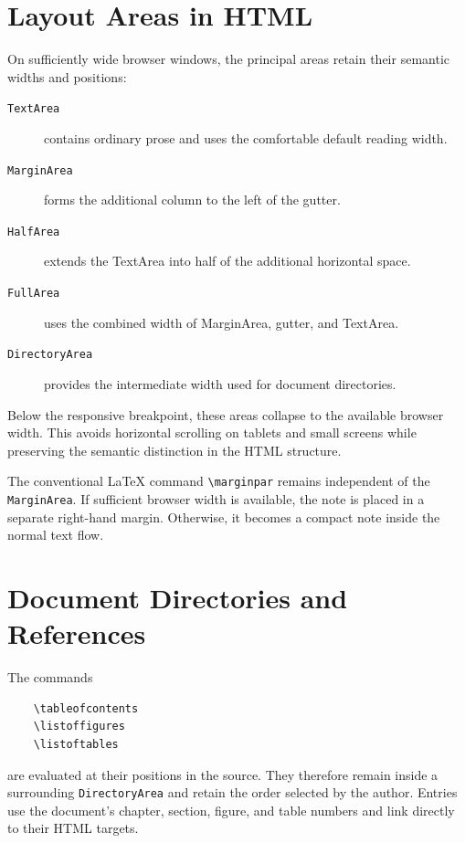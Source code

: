 \documentclass[
11pt,
a4paper,
oneside
]{scrbook}
\begin{document}
{\section{Layout Areas in HTML}

On sufficiently wide browser windows, the principal \mdlayout{} areas retain
their semantic widths and positions:

\begin{description}
	\item[\texttt{TextArea}]
	contains ordinary prose and uses the comfortable default reading width.

	\item[\texttt{MarginArea}]
	forms the additional column to the left of the gutter.

	\item[\texttt{HalfArea}]
	extends the TextArea into half of the additional horizontal space.

	\item[\texttt{FullArea}]
	uses the combined width of MarginArea, gutter, and TextArea.

	\item[\texttt{DirectoryArea}]
	provides the intermediate width used for document directories.
\end{description}

Below the responsive breakpoint, these areas collapse to the available browser
width. This avoids horizontal scrolling on tablets and small screens while
preserving the semantic distinction in the HTML structure.

The conventional \LaTeX{} command \verb|\marginpar| remains independent of the
\mdlayout{} \texttt{MarginArea}. If sufficient browser width is available, the
note is placed in a separate right-hand margin. Otherwise, it becomes a compact
note inside the normal text flow.

\section{Document Directories and References}

The commands

\begin{verbatim}
	\tableofcontents
	\listoffigures
	\listoftables
\end{verbatim}

are evaluated at their positions in the source. They therefore remain inside a
surrounding \texttt{DirectoryArea} and retain the order selected by the author.
Entries use the document's chapter, section, figure, and table numbers and link
directly to their HTML targets.

}
\end{document}
